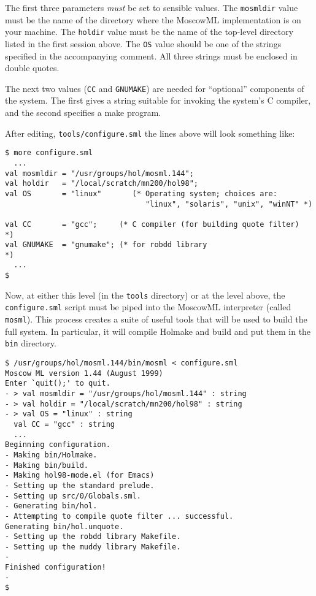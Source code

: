 The first three parameters \emph{must} be set to sensible values.  The
\texttt{mosmldir} value must be the name of the directory where the
MoscowML implementation is on your machine.  The \texttt{holdir} value
must be the name of the top-level directory listed in the first
session above.  The \texttt{OS} value should be one of the strings
specified in the accompanying comment.   All three strings must be
enclosed in double quotes.

The next two values (\texttt{CC} and \texttt{GNUMAKE}) are needed for
``optional'' components of the system.  The first gives a string
suitable for invoking the system's C compiler, and the second
specifies a \textsf{make} program.

After editing, \texttt{tools/configure.sml} the lines above will look
something like:

\begin{session}
\begin{verbatim}
$ more configure.sml
  ...
val mosmldir = "/usr/groups/hol/mosml.144";
val holdir   = "/local/scratch/mn200/hol98";
val OS       = "linux"       (* Operating system; choices are:
                                "linux", "solaris", "unix", "winNT" *)

val CC       = "gcc";     (* C compiler (for building quote filter)        *)
val GNUMAKE  = "gnumake"; (* for robdd library                             *)
  ...
$
\end{verbatim}
\end{session}

\noindent Now, at either this level (in the \texttt{tools} directory)
or at the level above, the \texttt{configure.sml} script must be piped
into the MoscowML interpreter (called \texttt{mosml}).  This process
creates a suite of useful tools that will be used to build the full
system.  In particular, it will compile \textsf{Holmake} and
\textsf{build} and put them in the \texttt{bin} directory.

\begin{session}
\begin{verbatim}
$ /usr/groups/hol/mosml.144/bin/mosml < configure.sml
Moscow ML version 1.44 (August 1999)
Enter `quit();' to quit.
- > val mosmldir = "/usr/groups/hol/mosml.144" : string
- > val holdir = "/local/scratch/mn200/hol98" : string
- > val OS = "linux" : string
  val CC = "gcc" : string
  ...
Beginning configuration.
- Making bin/Holmake.
- Making bin/build.
- Making hol98-mode.el (for Emacs)
- Setting up the standard prelude.
- Setting up src/0/Globals.sml.
- Generating bin/hol.
- Attempting to compile quote filter ... successful.
Generating bin/hol.unquote.
- Setting up the robdd library Makefile.
- Setting up the muddy library Makefile.
-
Finished configuration!
-
$
\end{verbatim}
\end{session}

